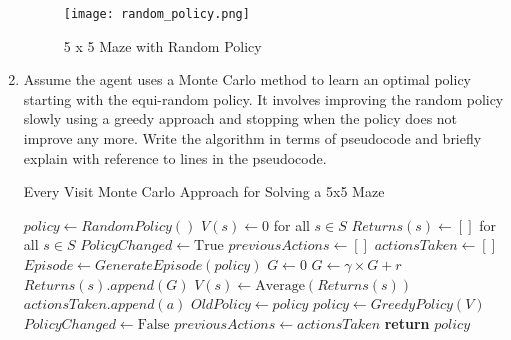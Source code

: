 \documentclass[letterpaper]{article} %
\begin{document}
\begin{enumerate}
	\begin{figure}[htbp]
	  \centering
	  \texttt{[image: random\_policy.png]}
	  \caption{5 x 5 Maze with Random Policy}
	  \label{fig:random_policy}
	\end{figure}

    \item Assume the agent uses a Monte Carlo method to learn an optimal policy starting with the equi-random policy. It involves improving the random policy slowly using a greedy approach and stopping when the policy does not improve any more. Write the algorithm in terms of pseudocode and briefly explain with reference to lines in the pseudocode.

    \begin{algorithm}
    \caption{Every Visit Monte Carlo Approach for Solving a 5x5 Maze}
    \begin{algorithmic}[1] %
	\State $policy \gets RandomPolicy()$
	\State $V(s) \gets 0$ for all $s \in S$
	\State $Returns(s) \gets []$ for all $s \in S$
	\State $PolicyChanged \gets \text{True}$
	\State $previousActions \gets []$
	\State $actionsTaken \gets []$
	    \State $Episode \gets GenerateEpisode(policy)$
	    \State $G \gets 0$
	     \label{alg:reversed_episode}
		\State $G \gets \gamma \times G + r$
		\State $Returns(s).append(G)$
		\State $V(s) \gets \text{Average}(Returns(s))$
		\State $actionsTaken.append(a)$
	    \EndFor
	    \State $OldPolicy \gets policy$
	    \State $policy \gets GreedyPolicy(V)$ \label{alg:greedy_policy}
	     \label{alg:action_compare}
		\State $PolicyChanged \gets \text{False}$
	    \EndIf
	    \State $previousActions \gets actionsTaken$
	\EndWhile
	\State \textbf{return} $policy$
    \EndProcedure
    \end{algorithmic}
	\label{alg:every_visit_mc}
    \end{algorithm}


\end{enumerate}
\end{document}
